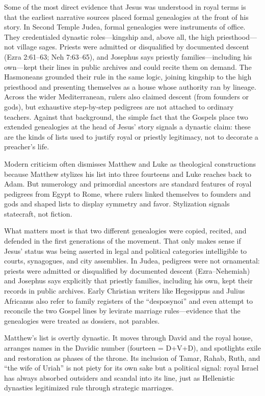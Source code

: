Some of the most direct evidence that Jesus was understood in royal terms is that the earliest narrative sources placed formal genealogies at the front of his story.
In Second Temple Judea, formal genealogies were instruments of office.
They credentialed dynastic roles—kingship and, above all, the high priesthood—not village sages.
Priests were admitted or disqualified by documented descent (Ezra 2:61–63; Neh 7:63–65), and Josephus says priestly families—including his own—kept their lines in public archives and could recite them on demand.
The Hasmoneans grounded their rule in the same logic, joining kingship to the high priesthood and presenting themselves as a house whose authority ran by lineage.
Across the wider Mediterranean, rulers also claimed descent (from founders or gods), but exhaustive step-by-step pedigrees are not attached to ordinary teachers.
Against that background, the simple fact that the Gospels place two extended genealogies at the head of Jesus’ story signals a dynastic claim: these are the kinds of lists used to justify royal or priestly legitimacy, not to decorate a preacher’s life.

Modern criticism often dismisses Matthew and Luke as theological constructions because Matthew stylizes his list into three fourteens and Luke reaches back to Adam.
But numerology and primordial ancestors are standard features of royal pedigrees from Egypt to Rome, where rulers linked themselves to founders and gods and shaped lists to display symmetry and favor.
Stylization signals statecraft, not fiction.

What matters most is that two different genealogies were copied, recited, and defended in the first generations of the movement.
That only makes sense if Jesus’ status was being asserted in legal and political categories intelligible to courts, synagogues, and city assemblies.
In Judea, pedigrees were not ornamental: priests were admitted or disqualified by documented descent (Ezra–Nehemiah) and Josephus says explicitly that priestly families, including his own, kept their records in public archives.
Early Christian writers like Hegesippus and Julius Africanus also refer to family registers of the “desposynoi” and even attempt to reconcile the two Gospel lines by levirate marriage rules—evidence that the genealogies were treated as dossiers, not parables.

Matthew’s list is overtly dynastic.
It moves through David and the royal house, arranges names in the Davidic number (fourteen = D+V+D), and spotlights exile and restoration as phases of the throne.
Its inclusion of Tamar, Rahab, Ruth, and “the wife of Uriah” is not piety for its own sake but a political signal: royal Israel has always absorbed outsiders and scandal into its line, just as Hellenistic dynasties legitimized rule through strategic marriages.

